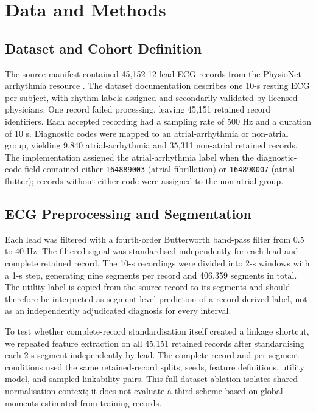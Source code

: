 \documentclass[journal]{IEEEtran}
\begin{document}
\section{Data and Methods}
\label{sec:methods}

\subsection{Dataset and Cohort Definition}
\label{subsec:dataset}

The source manifest contained 45,152 12-lead ECG records from the PhysioNet
arrhythmia resource
\cite{Zheng2022PhysioNetECG,Zheng2020OptimalArrhythmia,Zheng2020OptimalMultistage,Pollard2026PhysioNet}.
The dataset documentation
describes one 10-s resting ECG per subject, with rhythm labels assigned and
secondarily validated by licensed physicians. One record failed processing,
leaving 45,151 retained record identifiers. Each accepted recording had a
sampling rate of 500 Hz and a duration of 10 s. Diagnostic codes were mapped
to an atrial-arrhythmia or non-atrial group, yielding 9,840 atrial-arrhythmia
and 35,311 non-atrial retained records. The implementation assigned the
atrial-arrhythmia label when the diagnostic-code field contained either
\texttt{164889003} (atrial fibrillation) or \texttt{164890007} (atrial
flutter); records without either code were assigned to the non-atrial group.

\subsection{ECG Preprocessing and Segmentation}
\label{subsec:preprocessing}

Each lead was filtered with a fourth-order Butterworth band-pass filter from
0.5 to 40 Hz. The filtered signal was standardised independently for each lead
and complete retained record. The 10-s recordings were divided into 2-s
windows with a 1-s step, generating nine segments per record and 406,359
segments in total. The utility label is copied from the source record to
its segments and should therefore be interpreted as segment-level prediction
of a record-derived label, not as an independently adjudicated diagnosis for
every interval.

To test whether complete-record standardisation itself created a linkage
shortcut, we repeated feature extraction on all 45,151 retained records after
standardising each 2-s segment independently by lead. The complete-record and
per-segment conditions used the same retained-record splits, seeds, feature
definitions, utility model, and sampled linkability pairs. This full-dataset
ablation isolates shared normalisation context; it does not evaluate a third
scheme based on global moments estimated from training records.
\end{document}
